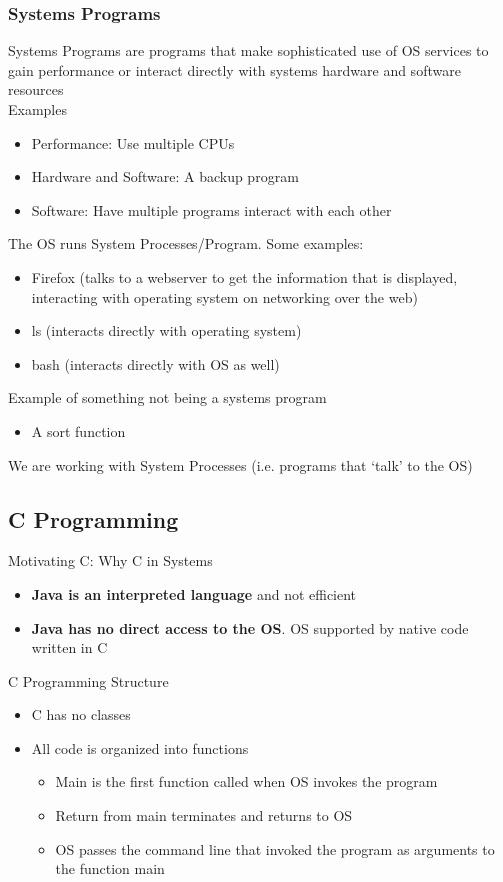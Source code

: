 \subsubsection{Systems Programs}
Systems Programs are programs that make sophisticated use of OS services to gain performance or interact directly with systems hardware and software resources
\vspace{0.15in}\\
Examples
\begin{itemize}
    \item Performance: Use multiple CPUs
    \item Hardware and Software: A backup program
    \item Software: Have multiple programs interact with each other
\end{itemize}
The OS runs System Processes/Program. Some examples: 
\begin{itemize}
    \item Firefox (talks to a webserver to get the information that is displayed, interacting with operating system on networking over the web)
    \item ls (interacts directly with operating system)
    \item bash (interacts directly with OS as well)
\end{itemize}
Example of something not being a systems program
\begin{itemize}
    \item A sort function
\end{itemize}
We are working with System Processes (i.e. programs that `talk' to the OS)

\subsection{C Programming}
Motivating C: Why C in Systems
\begin{itemize}
    \item \textbf{Java is an interpreted language} and not efficient
    \item \textbf{Java has no direct access to the OS}. OS supported by native code written in C
\end{itemize}
C Programming Structure
\begin{itemize}
    \item C has no classes
    \item All code is organized into functions
    \begin{itemize}
        \item Main is the first function called when OS invokes the program
        \item Return from main terminates and returns to OS
        \item OS passes the command line that invoked the program as arguments to the function main
    \end{itemize}
\end{itemize}
